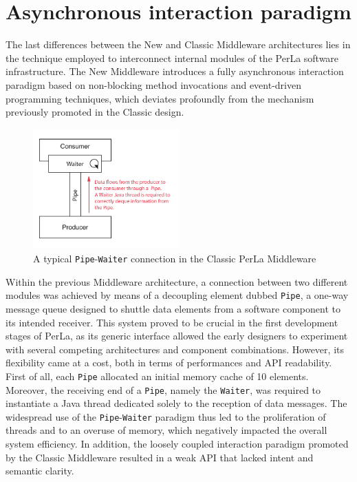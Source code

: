 \section{Asynchronous interaction paradigm}
\label{sec:newmiddleware.async}

The last differences between the New and Classic Middleware architectures lies
in the technique employed to interconnect internal modules of the PerLa
software infrastructure. The New Middleware introduces a fully asynchronous
interaction paradigm based on non-blocking method invocations and event-driven
programming techniques, which deviates profoundly from the mechanism previously
promoted in the Classic design.

\begin{figure}[h!]
    \center
    \includegraphics[width=0.5\textwidth]{imgs/pipe_waiter.pdf}
    \caption{A typical \texttt{Pipe}-\texttt{Waiter} connection in the Classic
        PerLa Middleware}
\end{figure}

Within the previous Middleware architecture, a connection between two different
modules was achieved by means of a decoupling element dubbed \texttt{Pipe}, a
one-way message queue designed to shuttle data elements from a software
component to its intended receiver. This system proved to be crucial in the
first development stages of PerLa, as its generic interface allowed the early
designers to experiment with several competing architectures and component
combinations. However, its flexibility came at a cost, both in terms of
performances and API readability. First of all, each \texttt{Pipe} allocated an
initial memory cache of 10 elements. Moreover, the receiving end of a
\texttt{Pipe}, namely the \texttt{Waiter}, was required to instantiate a Java
thread dedicated solely to the reception of data messages. The widespread use
of the \texttt{Pipe}-\texttt{Waiter} paradigm thus led to the proliferation of
threads and to an overuse of memory, which negatively impacted the overall
system efficiency. In addition, the loosely coupled interaction paradigm
promoted by the Classic Middleware resulted in a weak API that lacked intent
and semantic clarity.

